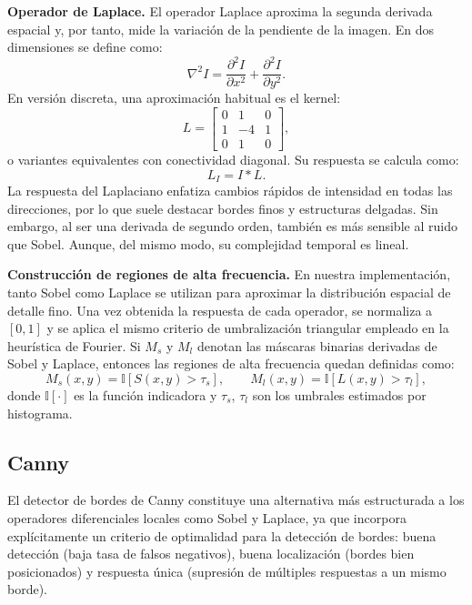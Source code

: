 \textbf{Operador de Laplace.} El operador Laplace aproxima la segunda derivada espacial y, por tanto, mide la variación de la pendiente de la imagen. En dos dimensiones se define como:
\begin{equation}
\nabla^2 I = \frac{\partial^2 I}{\partial x^2} + \frac{\partial^2 I}{\partial y^2}.
\end{equation}
En versión discreta, una aproximación habitual es el kernel:
\begin{equation}
L =
\begin{bmatrix}
0 & 1 & 0 \\
1 & -4 & 1 \\
0 & 1 & 0
\end{bmatrix},
\end{equation}
o variantes equivalentes con conectividad diagonal. Su respuesta se calcula como:
\begin{equation}
L_I = I * L.
\end{equation}
La respuesta del Laplaciano enfatiza cambios rápidos de intensidad en todas las direcciones, por lo que suele destacar bordes finos y estructuras delgadas. Sin embargo, al ser una derivada de segundo orden, también es más sensible al ruido que Sobel. Aunque, del mismo modo, su complejidad temporal es lineal.

\textbf{Construcción de regiones de alta frecuencia.} En nuestra implementación, tanto Sobel como Laplace se utilizan para aproximar la distribución espacial de detalle fino. Una vez obtenida la respuesta de cada operador, se normaliza a $[0,1]$ y se aplica el mismo criterio de umbralización triangular empleado en la heurística de Fourier. Si $M_s$ y $M_l$ denotan las máscaras binarias derivadas de Sobel y Laplace, entonces las regiones de alta frecuencia quedan definidas como:
\begin{equation}
M_s(x,y)=\mathbb{I}[S(x,y)>\tau_s],
\qquad
M_l(x,y)=\mathbb{I}[L(x,y)>\tau_l],
\end{equation}
donde $\mathbb{I}[\cdot]$ es la función indicadora y $\tau_s$, $\tau_l$ son los umbrales estimados por histograma.

\subsection{Canny}

El detector de bordes de Canny constituye una alternativa más estructurada a los operadores diferenciales locales como Sobel y Laplace, ya que incorpora explícitamente un criterio de optimalidad para la detección de bordes: buena detección (baja tasa de falsos negativos), buena localización (bordes bien posicionados) y respuesta única (supresión de múltiples respuestas a un mismo borde).

